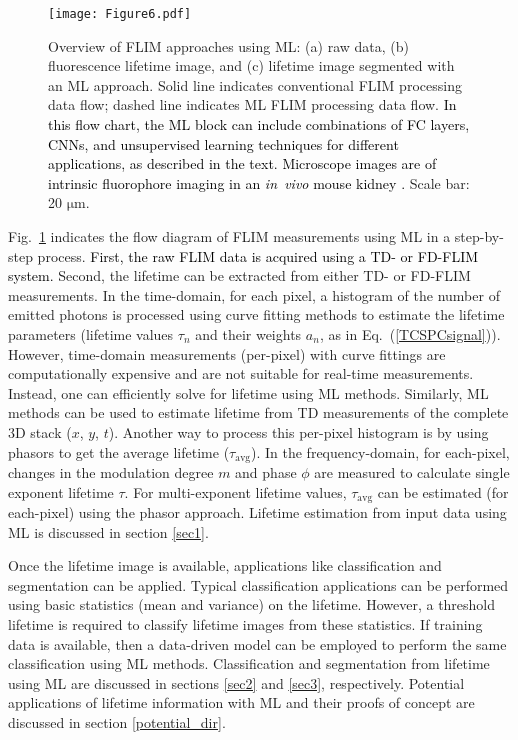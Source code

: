 \documentclass[12pt]{iopart}
\newcommand{\cc}[1]{\textcolor{black}{#1}}
\begin{document}
\begin{figure}[!t]
\centering
\texttt{[image: Figure6.pdf]}
\caption{Overview of FLIM approaches using ML: (a) raw data, (b) fluorescence lifetime image, and (c) lifetime image segmented with an ML approach. Solid line indicates conventional FLIM processing data flow; dashed line indicates ML FLIM processing data flow. \cc{In this flow chart, the ML block can include combinations of FC layers, CNNs, and unsupervised learning techniques for different applications, as described in the text. Microscope images are of intrinsic fluorophore imaging in an \textit{in~vivo} mouse kidney \cite{phasors}.} Scale bar: 20 $\mathrm{\mu}$m.}\label{fig_main4}
\end{figure}

Fig.~\ref{fig_main4} indicates the flow diagram of FLIM measurements using ML in a step-by-step process. \cc{First, the raw FLIM data is acquired using a TD- or FD-FLIM system.} Second, the lifetime can be extracted from either TD- or FD-FLIM measurements. In the time-domain, for each pixel, a histogram of the number of emitted photons is processed using curve fitting methods to estimate the lifetime parameters (lifetime values $\tau_n$ and their weights $a_n$, as in Eq.~(\ref{TCSPCsignal})). However, time-domain measurements (per-pixel) with curve fittings are computationally expensive and are not suitable for real-time measurements. Instead, one can efficiently solve for lifetime using ML methods. Similarly, ML methods can be used to estimate lifetime from TD measurements of the complete 3D stack ($x$, $y$, $t$). Another way to process this per-pixel histogram is by using phasors to get the average lifetime ($\tau_{\mathrm{avg}}$). In the frequency-domain, for each-pixel, changes in the modulation degree $m$ and phase $\phi$ are measured to calculate single exponent lifetime $\tau$. For multi-exponent lifetime values, $\tau_{\mathrm{avg}}$ can be estimated (for each-pixel) using the phasor approach. Lifetime estimation from input data using ML is discussed in section \ref{sec1}. 

Once the lifetime image is available, applications like classification and segmentation can be applied. Typical classification applications can be performed using basic statistics (mean and variance) on the lifetime. However, a threshold lifetime is required to classify lifetime images from these statistics. If training data is available, then a data-driven model can be employed to perform the same classification using ML methods. Classification and segmentation from lifetime using ML are discussed in sections \ref{sec2} and \ref{sec3}, respectively. Potential applications of lifetime information with ML and their proofs of concept are discussed in section \ref{potential_dir}.
\end{document}
